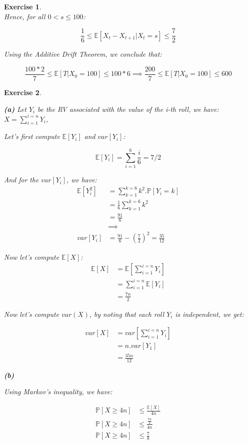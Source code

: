 \documentclass{article}
\newtheorem{exo}{Exercise}
\def\P{\mathbb{P}}
\def\E{\mathbb{E}}
\begin{document}
\begin{exo}{\ \\}
Hence, for all $0<s\leq 100$:

\[ 
    \frac{1}{6} \leq  \E[X_t - X_{t+1}| X_t = s] \leq \frac{7}{2}
\]

Using the Additive Drift Theorem, we conclude that:

\[ \frac{100*2}{7}  \leq \E[T | X_0 = 100] \leq 100 * 6 \implies 
\frac{200}{7} \leq \E[T|X_0 = 100] \leq 600 \]

\end{exo}

\begin{exo}{\ \\}

\noindent
\textbf{(a)} 
Let $Y_i$ be the RV associated with the value of the i-th roll, we have: $X = \sum_{i=1}^{i=n} Y_i$, 

Let's first compute $\E[Y_i]$ and $var[Y_i]$:

\[ \E[Y_i] = \sum^{6}_{i=1} \frac{i}{6} = 7/2 \]

And for the $var[Y_i]$, we have:
\begin{align*}
    \E[Y_i^2] 
    &= \sum_{k=1}^{k=6} k^2.\P[Y_i=k] \\
    &=\frac{1}{6}  \sum_{k=1}^{k=6} k^2 \\
    &= \frac{91}{6}\\
    &\implies \\
    var[Y_i] &= \frac{91}{6} - (\frac{7}{2})^2 = \frac{35}{12} 
\end{align*} 

Now let's compute $\E[X]$:
\begin{align*}
    \E[X] 
    &= \E[\sum_{i=1}^{i=n} Y_i]\\
    &= \sum_{i=1}^{i=n} \E[ Y_i] \\
    &= \frac{7n}{2}
\end{align*} 

Now let's compute $var(X)$, by noting that each roll $Y_i$ is independent, we get:

\begin{align*}
    var[X] 
    &= var[\sum_{i=1}^{i=n} Y_i] \\
    &= n . var[Y_1] \\
    &= \frac{35n}{12} 
\end{align*}

\noindent
\textbf{(b)} 

Using Markov's inequality, we have:

\begin{align*}
    \P[X \geq 4n]  &\leq \frac{\E[X]}{4n}\\
    \P[X \geq 4n]  &\leq \frac{\frac{7n}{2}}{4n}\\
    \P[X \geq 4n]  &\leq \frac{7}{8}\\
\end{align*} 


\end{exo}
\end{document}
